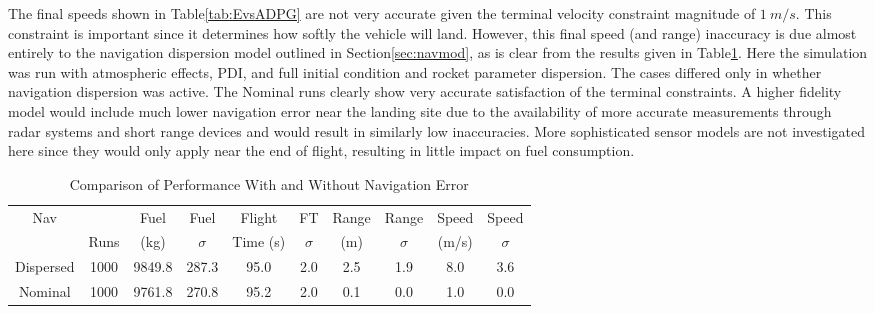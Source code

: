 The final speeds shown in Table\:\ref{tab:EvsADPG} are not very accurate given the terminal velocity constraint magnitude of $1\:m/s$. This constraint is important since it determines how softly the vehicle will land. However, this final speed (and range) inaccuracy is due almost entirely to the navigation dispersion model outlined in Section\:\ref{sec:navmod}, as is clear from the results given in Table\:\ref{tab:navvsnonav}. Here the simulation was run with atmospheric effects, PDI, and full initial condition and rocket parameter dispersion. The cases differed only in whether navigation dispersion was active. The Nominal runs clearly show very accurate satisfaction of the terminal constraints. A higher fidelity model would include much lower navigation error near the landing site due to the availability of more accurate measurements through radar systems and short range devices and would result in similarly low inaccuracies. More sophisticated sensor models are not investigated here since they would only apply near the end of flight, resulting in little impact on fuel consumption. 

\begin{table}[ht]                                                                                              
	\centering                             
	\caption{Comparison of Performance With and Without Navigation Error}                                          
	\label{tab:navvsnonav}                                                                          
	\begin{tabular}{|c|c|c|c|c|c|c|c|c|c|}                                                                         
		\hline                                                                                                        Nav &      &   Fuel    &    Fuel   & Flight    &   FT     &  Range    &  Range   & Speed   &   Speed  \\ 
		& Runs & (kg)      & $\sigma$  &  Time (s) & $\sigma$ &  (m) &    $  \sigma$ & (m/s)   & $\sigma$ \\
		
		\hline                                                                                                         
		Dispersed & 1000 & 9849.8 & 287.3 & 95.0 & 2.0 & 2.5 & 1.9 & 8.0 & 3.6 \\                                      
		\hline                                                                                                         
		Nominal & 1000 & 9761.8 & 270.8 & 95.2 & 2.0 & 0.1 & 0.0 & 1.0 & 0.0 \\                                   
		\hline                                                                                                         
	\end{tabular}                                                                                                  
	
\end{table}   

